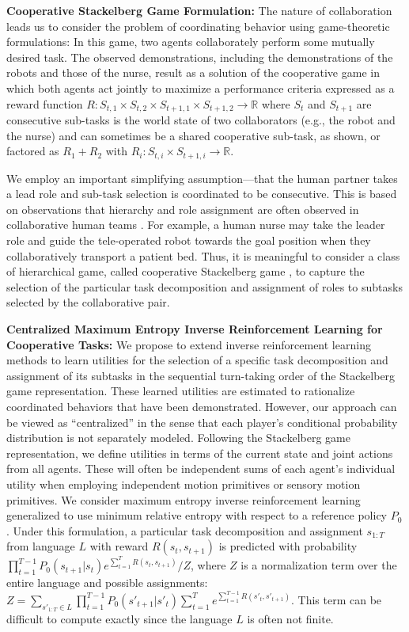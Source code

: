 \documentclass[letterpaper, 11 pt, onecolumn]{article}
\begin{document}
\noindent
{\bf Cooperative Stackelberg Game Formulation:} 
The nature of collaboration leads us to consider the problem of coordinating behavior using game-theoretic formulations: In this game, two agents collaborately perform some mutually desired task. The observed demonstrations, including the demonstrations of the robots and those of the nurse, result as a solution of the cooperative game in which both agents act jointly to maximize a performance criteria expressed as a reward function $R: S_{t,1} \times S_{t,2} \times S_{t+1,1}\times S_{t+1,2} \rightarrow \mathbb{R}$ where $S_t$ and $S_{t+1}$ are consecutive sub-tasks is the world state of two collaborators (e.g., the robot and the nurse) and can sometimes be a shared cooperative sub-task, as shown, or factored as $R_1 + R_2$ with $R_i: S_{t,i} \times S_{t+1,i} \rightarrow \mathbb{R}$.

We employ an important simplifying assumption---that the human partner takes a lead role and sub-task selection is coordinated to be consecutive.  This is based on observations that 
hierarchy and role assignment are often observed in collaborative human teams \cite{mortl2012role,colman2014explaining}. For example, a human nurse may take the leader role and guide the tele-operated robot
towards the goal position when they collaboratively transport a patient bed. Thus, it is meaningful to consider a class of hierarchical game, called cooperative Stackelberg game \cite{basar1999dynamic}, to capture the selection of the particular task decomposition and assignment of roles to subtasks selected by the collaborative pair.

\noindent 
{\bf Centralized Maximum Entropy Inverse Reinforcement Learning for Cooperative Tasks:} We propose to extend inverse reinforcement learning methods \cite{ziebart2008maximum} to learn utilities for the selection of a specific task decomposition and assignment of its subtasks in the sequential turn-taking order of the Stackelberg game representation. These learned utilities are estimated to rationalize coordinated behaviors that have been demonstrated.  
However, our approach can be viewed as ``centralized'' in the sense that each player's conditional probability distribution is not separately modeled.
Following the Stackelberg game representation, we define utilities in terms of the current state and joint actions from all agents. These will often be independent sums of each agent's individual utility when employing independent motion primitives or sensory motion primitives. 
We consider maximum entropy inverse reinforcement learning \cite{ziebart2008maximum} generalized to use minimum relative entropy with respect to a reference policy $P_0$.
Under this formulation, a particular task decomposition and assignment $s_{1:T}$  from language $L$ with reward $R(s_t,s_{t+1})$ is predicted with probability $\prod_{t=1}^{T-1} P_0(s_{t+1}|s_t) e^{\sum_{t=1}^T R(s_t,s_{t+1})}/Z$, where $Z$ is a normalization term over the entire language and possible assignments: $Z = \sum_{s'_{1:T}\in L} \prod_{t=1}^{T-1} P_0(s'_{t+1}|s'_t) \sum_{t=1}^T e^{\sum_{t=1}^{T-1} R(s'_t,s'_{t+1})}$. This term can be difficult to compute exactly since the language $L$ is often not finite.
\end{document}
